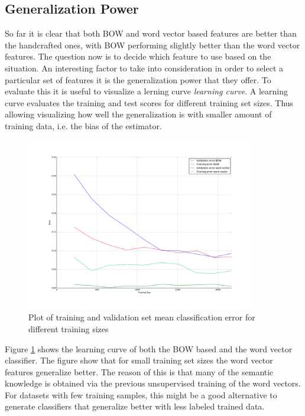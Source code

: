 \subsection{Generalization Power}
\label{sec:sub_w2v4tc_gen_power}
So far it is clear that both \ac{BOW} and word vector based features are
better than the handcrafted ones, with \ac{BOW}  performing slightly
better than the word vector features. The question now is to decide which
feature to use based on the situation. An interesting factor to take into
consideration in order to select a particular set of features it is the
generalization power that they offer.  To evaluate this it is useful to
visualize a lerning curve \textit{learning curve}. A learning curve evaluates
the training and test scores for different training set sizes. Thus allowing
visualizing how well the generalization is with smaller amount of training
data, i.e. the bias of the estimator.


\begin{figure}[hptb!]
	\begin{center}

			\includegraphics[width=0.9\textwidth]{images/plot-models.pdf} 

	\end{center}
	\caption{Plot of training and validation set mean classification  error
          for different training sizes}
	\label{fig:w2v4tc_learning_curve}
\end{figure}

Figure \ref{fig:w2v4tc_learning_curve} shows the learning curve of both the
\ac{BOW} based and the word vector classifier. The figure show that for small
training set sizes the word vector features generalize better. The reason of
this is that many of the semantic knowledge is obtained via the previous unsupervised
training of the word vectors. For datasets with few training samples, this
might be a good alternative to generate classifiers that generalize better
with less labeled trained data.


